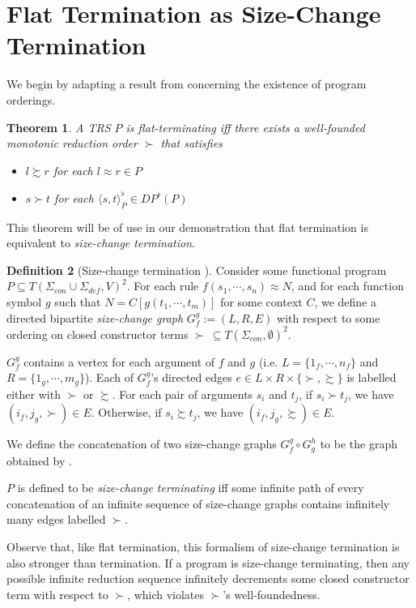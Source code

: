 \documentclass{article}
\newtheorem{theorem}{Theorem}%
\theoremstyle{definition}
\newtheorem{definition}[theorem]{Definition}
\begin{document}
\section{Flat Termination as Size-Change Termination}
We begin by adapting a result from \cite{arts2000dependency} concerning the existence of program orderings.
\begin{theorem}
    A TRS $P$ is flat-terminating iff there exists a well-founded monotonic reduction order $\succ$ that satisfies \begin{itemize}
        \item $l \succsim r$ for each $l \approx r \in P$
        \item $s \succ t$ for each $\langle s, t \rangle^\flat_P \in DP^\flat(P)$
    \end{itemize}
\end{theorem}
This theorem will be of use in our demonstration that flat termination is equivalent to \emph{size-change termination}.

\begin{definition}[Size-change termination \cite{lee2001sizechange,thiemann2005sizechange}]
    Consider some functional program $P \subseteq T(\Sigma_{con} \cup \Sigma_{def}, V)^2$. For each rule $f(s_1, \cdots, s_n) \approx N$, and for each function symbol $g$ such that $N = C[g(t_1, \cdots, t_m)]$ for some context $C$, we define a directed bipartite \emph{size-change graph} $G_f^g := (L, R, E)$ with respect to some ordering on closed constructor terms $\succ ~ \subseteq T(\Sigma_{con}, \emptyset)^2$.

    $G_f^g$ contains a vertex for each argument of $f$ and $g$ (i.e. $L = \{1_f, \cdots, n_f\}$ and $R = \{1_g, \cdots, m_g\}$). Each of $G_f^g$'s directed edges $e \in L \times R \times \{\succ, \succsim\}$ is labelled either with $\succ$ or $\succsim$. For each pair of arguments $s_i$ and $t_j$, if $s_i \succ t_j$, we have $(i_f, j_g, \succ) \in E$. Otherwise, if $s_i \succsim t_j$, we have $(i_f, j_g, \succsim) \in E$.

    We define the concatenation of two size-change graphs $G_f^g \circ G_g^h$ to be the graph obtained by .

   $P$ is defined to be \emph{size-change terminating} iff some infinite path of every concatenation of an infinite sequence of size-change graphs contains infinitely many edges labelled $\succ$.
\end{definition}
Observe that, like flat termination, this formalism of size-change termination is also stronger than termination. If a program is size-change terminating, then any possible infinite reduction sequence infinitely decrements some closed constructor term with respect to $\succ$, which violates $\succ$'s well-foundedness.
\end{document}

